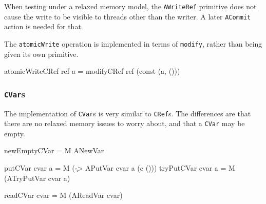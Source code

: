 

When testing under a relaxed memory model, the \verb|AWriteRef|
primitive does not cause the write to be visible to threads other than
the writer. A later \verb|ACommit| action is needed for that.


The \verb|atomicWrite| operation is implemented in terms of
\verb|modify|, rather than being given its own primitive.

\begin{haskellcode}
atomicWriteCRef ref a = modifyCRef ref (const (a, ()))
\end{haskellcode}

\subsubsection{\texttt{CVar}s}
\label{sec:execution-primops-cvar}

The implementation of \verb|CVar|s is very similar to \verb|CRef|s.
The differences are that there are no relaxed memory issues to worry
about, and that a \verb|CVar| may be empty.

\begin{haskellcode}
newEmptyCVar = M ANewVar
\end{haskellcode}


\begin{haskellcode}
putCVar    cvar a = M (\c -> APutVar cvar a (c ()))
tryPutCVar cvar a = M (ATryPutVar cvar a)
\end{haskellcode}



\begin{haskellcode}
readCVar cvar = M (AReadVar cvar)
\end{haskellcode}

